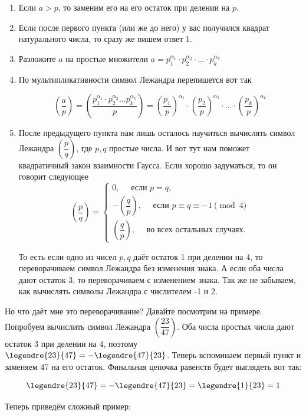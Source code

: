 \begin{enumerate}
    \item Если $a>p$, то заменим его на его остаток при делении на $p$.
    \item Если после первого пункта (или же до него) у вас получился квадрат натурального числа, то сразу же пишем ответ 1.
    \item Разложите $a$ на простые множители $a = p_1^{\alpha_1}\cdotp p_2^{\alpha_2} \cdot \ldots \cdot p_k^{\alpha_k}$
    \item По мультипликативности символ Лежандра перепишется вот так

    $$
    \left(\dfrac{a}{p}\right) = \left(\dfrac{p_1^{\alpha_1}\cdotp p_2^{\alpha_2} \ldots p_k^{\alpha_k}}{p}\right) = \left(\dfrac{p_1}{p}\right)^{\alpha_1}\cdot\left(\dfrac{p_2}{p}\right)^{\alpha_2}\cdot \ldots \cdot \left(\dfrac{p_k}{p}\right)^{\alpha_k}
    $$
    \item После предыдущего пункта нам лишь осталось научиться вычислять символ Лежандра $\left(\dfrac{p}{q}\right)$, где $p,q$ простые числа. И вот тут нам поможет квадратичный закон взаимности Гаусса. Если хорошо задуматься, то он говорит следующее
    $$
    \left(\frac{p}{q}\right)=\left\{\begin{array}{l}
    0, \quad \text { если } p =q, \\
    -\left(\dfrac{q}{p}\right), \quad \text { если }  p\equiv q \equiv -1\pmod{4}\\
    \left(\dfrac{q}{p}\right), \quad \text { во всех остальных случаях.} 
    \end{array}\right.
    $$

    То есть если одно из чисел $p,q$ даёт остаток 1 при делении на 4, то переворачиваем символ Лежандра без изменения знака. А если оба числа дают остаток 3, то переворачиваем с изменением знака. Так же не забываем, как вычислять символы Лежандра с числителем -1 и 2.
\end{enumerate}

Но что даёт мне это переворачивание? Давайте посмотрим на примере. Попробуем вычислить символ Лежандра $\left(\dfrac{23}{47}\right)$. Оба числа простых числа дают остаток 3 при делении на 4, поэтому $\legendre{23}{47} = -\legendre{47}{23}$. Теперь вспоминаем первый пункт и заменяем 47 на его остаток. Финальная цепочка равенств будет выглядеть вот так:

$$
\legendre{23}{47} = -\legendre{47}{23} = \legendre{1}{23} = 1
$$

Теперь приведём сложный пример:

